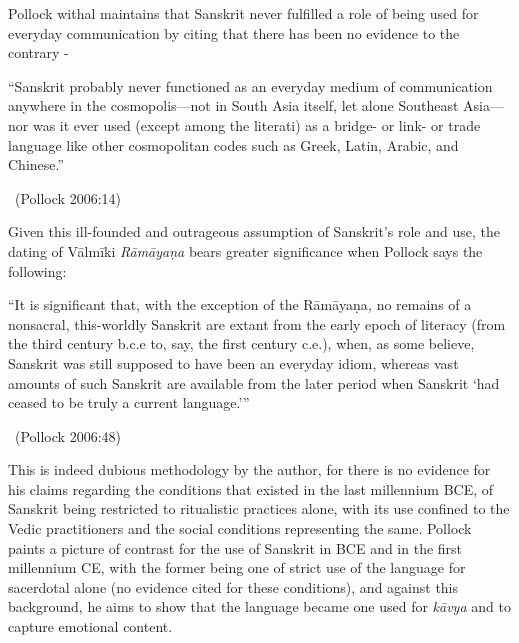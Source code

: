 Pollock withal maintains that Sanskrit never fulfilled a role of being used for everyday communication by citing that there has been no evidence to the contrary -

\begin{myquote}
“Sanskrit probably never functioned as an everyday medium of communication anywhere in the cosmopolis—not in South Asia itself, let alone Southeast Asia— nor was it ever used (except among the literati) as a bridge- or link- or trade language like other cosmopolitan codes such as Greek, Latin, Arabic, and Chinese.” 

~\hfill (Pollock 2006:14)
\end{myquote}

Given this ill-founded and outrageous assumption of Sanskrit’s role and use, the dating of Vālmīki \textit{Rāmāyaṇa} bears greater significance when Pollock says the following:

\begin{myquote}
“It is significant that, with the exception of the Rāmāyaṇa\textit{,} no remains of a nonsacral, this-worldly Sanskrit are extant from the early epoch of literacy (from the third century b.c.e to, say, the first century c.e.), when, as some believe, Sanskrit was still supposed to have been an everyday idiom, whereas vast amounts of such Sanskrit are available from the later period when Sanskrit ‘had ceased to be truly a current language.’” 

~\hfill (Pollock 2006:48)
\end{myquote}

This is indeed dubious methodology by the author, for there is no evidence for his claims regarding the conditions that existed in the last millennium BCE, of Sanskrit being restricted to ritualistic practices alone, with its use confined to the Vedic practitioners and the social conditions representing the same. Pollock paints a picture of contrast for the use of Sanskrit in BCE and in the first millennium CE, with the former being one of strict use of the language for sacerdotal alone (no evidence cited for these conditions), and against this background, he aims to show that the language became one used for \textit{kāvya} and to capture emotional content.

